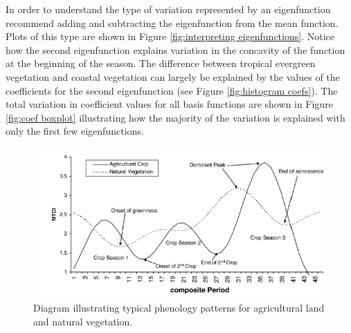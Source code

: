 In order to understand the type of variation represented by an eigenfunction \cite{FDA} recommend adding and subtracting the eigenfunction from the mean function. Plots of this type are shown in Figure \ref{fig:interpreting eigenfunctions}. Notice how the second eigenfunction explains variation in the concavity of the function at the beginning of the season. The difference between tropical evergreen vegetation and coastal vegetation can largely be explained by the values of the coefficients for the second eigenfunction (see Figure \ref{fig:histogram coefs}). The total variation in coefficient values for all basis functions are shown in Figure \ref{fig:coef boxplot} illustrating how the majority of the variation is explained with only the first few eigenfunctions. 
\begin{figure}
	[htbp] 
	
	\centering 
	\includegraphics[width=\linewidth]{Images-future-work/PhenoVars_Jegan.png} 
	\caption{Diagram illustrating typical phenology patterns for agricultural land and natural vegetation. } 	\label{fig:phenology diagram} 
\end{figure}

